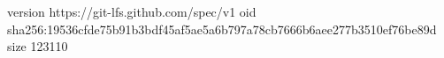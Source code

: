 version https://git-lfs.github.com/spec/v1
oid sha256:19536cfde75b91b3bdf45af5ae5a6b797a78cb7666b6aee277b3510ef76be89d
size 123110
